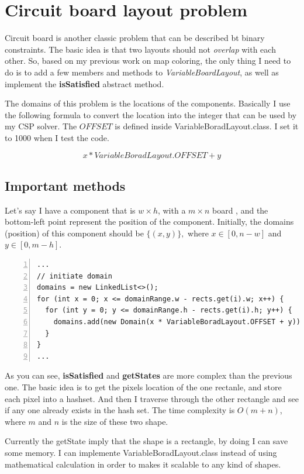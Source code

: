\documentclass{article}
\begin{document}
\clearpage
\section{Circuit board layout problem}
Circuit board is another classic problem that can be described bt binary constraints. The basic idea is that two layouts should not \emph{overlap } with each other. So, based on my previous work on map coloring, the only thing I need to do is to add a few members and methods to \emph{VariableBoardLayout}, as well as implement the \textbf{isSatisfied} abstract method.

The domains of this problem is the locations of the components. Basically I use the following formula to convert the location into the integer that can be used by my CSP solver. The $OFFSET$ is defined inside VariableBoradLayout.class. I set it to 1000 when I test the code.

$$x * VariableBoradLayout.OFFSET + y$$

\subsection{Important methods}


Let's say I have a component that is $w\times h$, with a $m\times n$ board , and the bottom-left point represent the position of the component. Initially, the domains (position) of this component should be $\{(x, y)\}, $ where $ x\in [0, n - w] $ and $ y\in [0, m - h].$


\begin{lstlisting}[numbers=left, caption=DriverBoardLayout.class] 
...
// initiate domain
domains = new LinkedList<>();
for (int x = 0; x <= domainRange.w - rects.get(i).w; x++) {
  for (int y = 0; y <= domainRange.h - rects.get(i).h; y++) {
    domains.add(new Domain(x * VariableBoradLayout.OFFSET + y));
  }
}
...
\end{lstlisting}



As you can see, \textbf{isSatisfied} and \textbf{getStates} are more complex than the previous one. The basic idea is to get the pixels location of the one rectanle, and store each pixel into a hashset. And then I traverse through the other rectangle and see if any one already exists in the hash set. The time complexity is $O(m + n)$, where $m$ and $n$ is the size of these two shape.

Currently the getState imply that the shape is a rectangle, by doing I can save some memory. I can implemente VariableBoradLayout.class instead of using mathematical calculation in order to makes it scalable to any kind of shapes.
\end{document}
